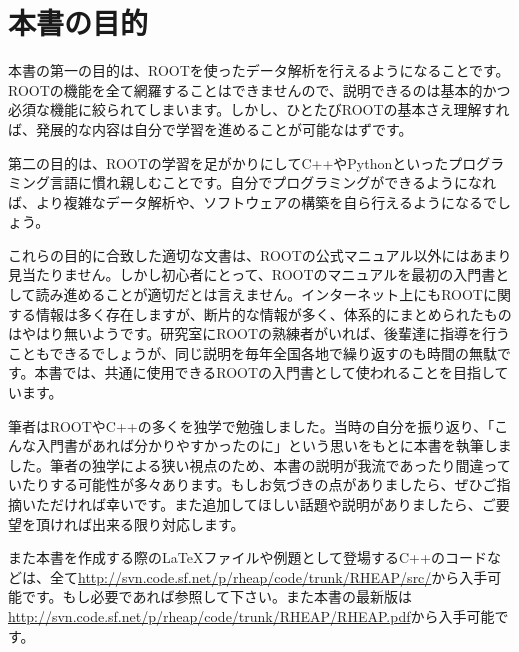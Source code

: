 
\section{本書の目的}

本書の第一の目的は、ROOTを使ったデータ解析を行えるようになることです。ROOTの機能を全て網羅することはできませんので、説明できるのは基本的かつ必須な機能に絞られてしまいます。しかし、ひとたびROOTの基本さえ理解すれば、発展的な内容は自分で学習を進めることが可能なはずです。

第二の目的は、ROOTの学習を足がかりにしてC++やPythonといったプログラミング言語に慣れ親しむことです。自分でプログラミングができるようになれば、より複雑なデータ解析や、ソフトウェアの構築を自ら行えるようになるでしょう。

これらの目的に合致した適切な文書は、ROOTの公式マニュアル以外にはあまり見当たりません。しかし初心者にとって、ROOTのマニュアルを最初の入門書として読み進めることが適切だとは言えません。インターネット上にもROOTに関する情報は多く存在しますが、断片的な情報が多く、体系的にまとめられたものはやはり無いようです。研究室にROOTの熟練者がいれば、後輩達に指導を行うこともできるでしょうが、同じ説明を毎年全国各地で繰り返すのも時間の無駄です。本書では、共通に使用できるROOTの入門書として使われることを目指しています。

筆者はROOTやC++の多くを独学で勉強しました。当時の自分を振り返り、「こんな入門書があれば分かりやすかったのに」という思いをもとに本書を執筆しました。筆者の独学による狭い視点のため、本書の説明が我流であったり間違っていたりする可能性が多々あります。もしお気づきの点がありましたら、ぜひご指摘いただければ幸いです。また追加してほしい話題や説明がありましたら、ご要望を頂ければ出来る限り対応します。

また本書を作成する際の{\LaTeX}ファイルや例題として登場するC++のコードなどは、全て\url{http://svn.code.sf.net/p/rheap/code/trunk/RHEAP/src/}から入手可能です。もし必要であれば参照して下さい。また本書の最新版は\url{http://svn.code.sf.net/p/rheap/code/trunk/RHEAP/RHEAP.pdf}から入手可能です。

